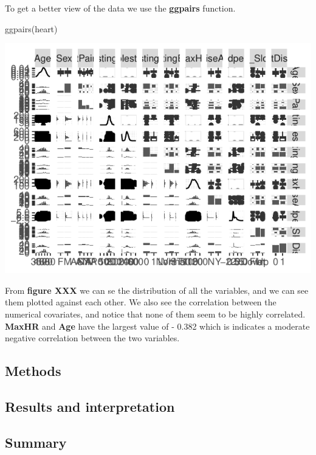\documentclass[
]{article}
\newenvironment{Shaded}{\begin{snugshade}}{\end{snugshade}}
\newcommand{\FunctionTok}[1]{\textcolor[rgb]{0.00,0.00,0.00}{#1}}
\newcommand{\NormalTok}[1]{#1}
\begin{document}
To get a better view of the data we use the \textbf{ggpairs} function.

\begin{Shaded}
\begin{Highlighting}[]
\FunctionTok{ggpairs}\NormalTok{(heart)}
\end{Highlighting}
\end{Shaded}

\begin{center}\includegraphics{Main_Text_files/figure-latex/unnamed-chunk-4-1} \end{center}

From \textbf{figure XXX} we can se the distribution of all the
variables, and we can see them plotted against each other. We also see
the correlation between the numerical covariates, and notice that none
of them seem to be highly correlated. \textbf{MaxHR} and \textbf{Age}
have the largest value of - 0.382 which is indicates a moderate negative
correlation between the two variables.

\hypertarget{methods}{%
\subsection{Methods}\label{methods}}

\hypertarget{results-and-interpretation}{%
\subsection{Results and
interpretation}\label{results-and-interpretation}}

\hypertarget{summary}{%
\subsection{Summary}\label{summary}}
\end{document}
